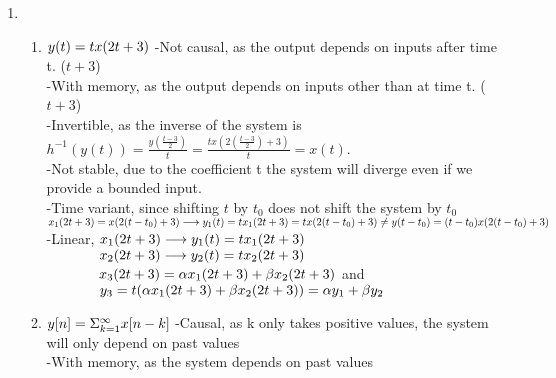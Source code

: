 \documentclass[10pt,a4paper, margin=1in]{article}
\begin{document}
\begin{enumerate}
\item %
    \begin{enumerate}
    \item %
        $y(t) = tx(2t+3)\vspace{0.3cm}\\$
        -Not causal, as the output depends on inputs after time t. ($t+3$)\vspace{0.1cm}\\
        -With memory, as the output depends on inputs other than at time t. ($t+3$)\vspace{0.1cm}\\
        -Invertible, as the inverse of the system is $h^{-1}(y(t)) = \frac{y(\frac{t-3}{2})}{t} = \frac{tx(2(\frac{t-3}{2})+3)}{t} = x(t)$.\vspace{0.1cm}\\
        -Not stable, due to the coefficient t the system will diverge even if we provide a bounded input.\vspace{0.1cm}\\
        -Time variant, since shifting $t$ by $t_0$ does not shift the system by $t_0$\\ 
                \hspace*{1.3cm}$x_1(2t+3) = x(2(t-t_0)+3) \longrightarrow y_1(t) = tx_1(2t+3) = tx(2(t-t_0)+3) \neq y(t-t_0) = (t-t_0)x(2(t-t_0)+3)\vspace{0.2cm}$\\
        -Linear, $x_1(2t+3) \longrightarrow y_1(t) = tx_1(2t+3)\\$
                 $\hspace*{1.3cm} x_2(2t+3) \longrightarrow y_2(t) = tx_2(2t+3)\\$
                 $\hspace*{1.3cm} x_3(2t+3) = \alpha x_1(2t+3) + \beta x_2(2t+3)$ and \\
                 $\hspace*{1.3cm} y_3 = t(\alpha x_1(2t+3) + \beta x_2(2t+3)) = \alpha y_1 + \beta y_2$
    \item %
        $y[n] = \Sigma^{\infty}_{k=1}x[n-k]\vspace{0.3cm}\\$
        -Causal, as k only takes positive values, the system will only depend on past values\vspace{0.1cm}\\
        -With memory, as the system depends on past values\vspace{0.1cm}\\

\end{enumerate}
\end{enumerate}
\end{document}
